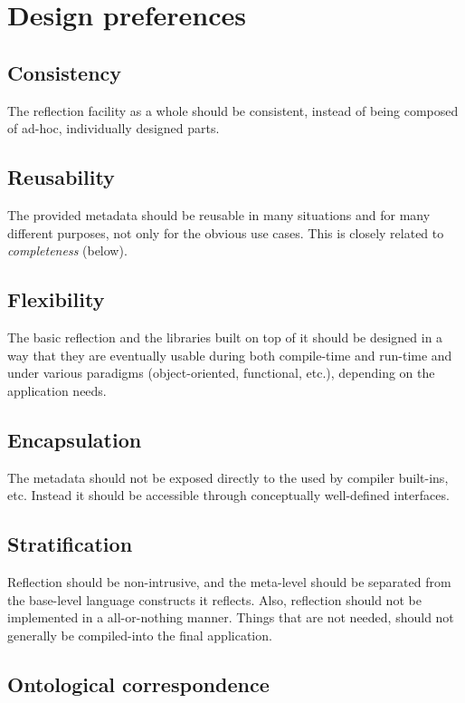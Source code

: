 \section{Design preferences}


\subsection{Consistency}

The reflection facility as a whole
should be consistent, instead of being composed of ad-hoc, individually
designed parts.

\subsection{Reusability}

The provided metadata should be reusable
in many situations and for many different purposes, not only
for the obvious use cases. This is closely related to {\em completeness} (below).

\subsection{Flexibility}

The basic reflection and the libraries
built on top of it should be designed
in a way that they are eventually usable during both compile-time
and run-time and under various paradigms (object-oriented, functional, etc.),
depending on the application needs.

\subsection{Encapsulation}

The metadata should not be exposed directly to the used by compiler built-ins, etc.
Instead it should be accessible through conceptually well-defined interfaces.

\subsection{Stratification}

Reflection should be non-intrusive,
and the meta-level should be separated from the base-level language
constructs it reflects. Also, reflection should not be implemented
in a all-or-nothing manner. Things that are not needed, should not generally
be compiled-into the final application.

\subsection{Ontological correspondence}

